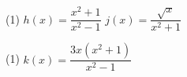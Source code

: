 \documentclass[../mathNotesPreamble]{subfiles}
\begin{document}
  \begin{extasks}[after-item-skip=\stretch{1}](1)
    \task $h(x)=\dfrac{x^2+1}{x^2-1}$
    \task $j(x)=\dfrac{\sqrt{x}}{x^2+1}$
  \end{extasks}
  \pagebreak

  \begin{extasks}[after-item-skip=\stretch{1}](1)
    \task $k(x)=\dfrac{3x(x^2+1)}{x^2-1}$
  \end{extasks}

  \pagebreak
\end{document}
